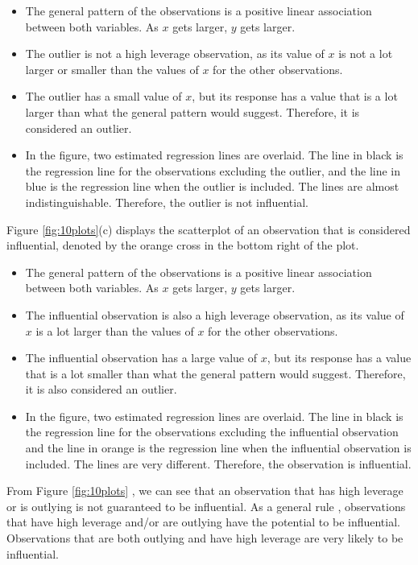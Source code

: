 \documentclass[
]{book}
\providecommand{\tightlist}{%
  \setlength{\itemsep}{0pt}\setlength{\parskip}{0pt}}
\begin{document}
\begin{itemize}
\tightlist
\item
  The general pattern of the observations is a positive linear association between both variables. As \(x\) gets larger, \(y\) gets larger.
\item
  The outlier is not a high leverage observation, as its value of \(x\) is not a lot larger or smaller than the values of \(x\) for the other observations.
\item
  The outlier has a small value of \(x\), but its response has a value that is a lot larger than what the general pattern would suggest. Therefore, it is considered an outlier.
\item
  In the figure, two estimated regression lines are overlaid. The line in black is the regression line for the observations excluding the outlier, and the line in blue is the regression line when the outlier is included. The lines are almost indistinguishable. Therefore, the outlier is not influential.
\end{itemize}

Figure \ref{fig:10plots}(c) displays the scatterplot of an observation that is considered influential, denoted by the orange cross in the bottom right of the plot.

\begin{itemize}
\tightlist
\item
  The general pattern of the observations is a positive linear association between both variables. As \(x\) gets larger, \(y\) gets larger.
\item
  The influential observation is also a high leverage observation, as its value of \(x\) is a lot larger than the values of \(x\) for the other observations.
\item
  The influential observation has a large value of \(x\), but its response has a value that is a lot smaller than what the general pattern would suggest. Therefore, it is also considered an outlier.
\item
  In the figure, two estimated regression lines are overlaid. The line in black is the regression line for the observations excluding the influential observation and the line in orange is the regression line when the influential observation is included. The lines are very different. Therefore, the observation is influential.
\end{itemize}

From Figure \ref{fig:10plots} , we can see that an observation that has high leverage or is outlying is not guaranteed to be influential. As a general rule , observations that have high leverage and/or are outlying have the potential to be influential. Observations that are both outlying and have high leverage are very likely to be influential.
\end{document}
